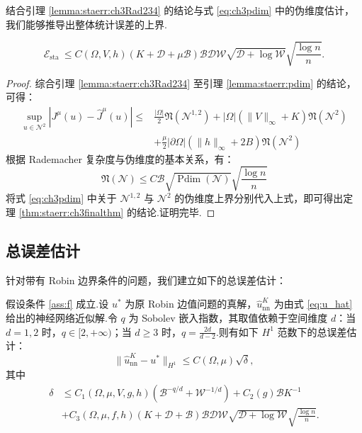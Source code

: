 结合引理 \ref{lemma:staerr:ch3Rad234} 的结论与式 \eqref{eq:ch3pdim} 中的伪维度估计，我们能够推导出整体统计误差的上界.
\begin{theorem}[统计误差]\label{thm:staerr:ch3finalthm}
\begin{equation*}
\mathcal{E}_{\text {sta }}\leq C(\Omega,V,h)\left(K+\mathcal{D} +\mu\mathcal{B}\right)\mathcal{B}\mathcal{D} \mathcal{W} \sqrt{\mathcal{D}+\log \mathcal{W}}\sqrt{\frac{\log n}{n}}.
\end{equation*}
\end{theorem}

\begin{proof}
综合引理 \ref{lemma:staerr:ch3Rad234} 至引理 \ref{lemma:staerr:pdim} 的结论，可得：
\begin{equation*}
\begin{aligned}
\sup _{u \in \mathcal{N}^{2}}\left|J^{\mu}(u)-\widehat{J}^{\mu}(u)\right|\leq &\frac{|\Omega|}{2}\mathfrak{N}\left(\mathcal{N}^{1,2}\right)+|\Omega|\left(\|V\|_{\infty}+K\right)\mathfrak{N}\left(\mathcal{N}^{2}\right)\\
&+\frac{\mu}{2}|\partial\Omega|\left(\|h\|_{\infty}+2B\right)\mathfrak{N}\left(\mathcal{N}^{2}\right)
\end{aligned}
\end{equation*}
根据 Rademacher 复杂度与伪维度的基本关系，有：
\begin{equation*}
\mathfrak{N}\left(\mathcal{N}\right)\leq C\mathcal{B}\sqrt{\operatorname{Pdim}(\mathcal{N})} \sqrt{\frac{\log{n}}{n}}
\end{equation*}
将式 \eqref{eq:ch3pdim} 中关于 $\mathcal{N}^{1,2}$ 与 $\mathcal{N}^{2}$ 的伪维度上界分别代入上式，即可得出定理 \ref{thm:staerr:ch3finalthm} 的结论.证明完毕.
\end{proof}


\subsection{总误差估计}\label{sec:mainres}
针对带有 Robin 边界条件的问题，我们建立如下的总误差估计：
\begin{theorem}\label{mainthm:robin}
假设条件 \ref{ass:f} 成立.设 $u^*$ 为原 Robin 边值问题的真解，$\widehat{u}_{\text{nn}}^{K}$ 为由式 \eqref{eq:u_hat} 给出的神经网络近似解.令 $q$ 为 Sobolev 嵌入指数，其取值依赖于空间维度 $d$：当 $d=1,2$ 时，$q \in [2, +\infty)$；当 $d\geq 3$ 时，$q = \frac{2d}{d-2}$.则有如下 $H^1$ 范数下的总误差估计：
\begin{equation*}
\|\widehat{u}_{\text{nn}}^K-u^*\|_{H^{1}}\leq C(\Omega,\mu)\sqrt{\delta},
\end{equation*}
其中
\begin{equation*}
\begin{aligned}
\delta&\leq\displaystyle C_1\left(\Omega, \mu, V, g, h\right) \left(\mathcal{B}^{-q / d}+\mathcal{W}^{-1 / d}\right)+C_2(g) \mathcal{B}K^{-1}\\
{}&\displaystyle+C_3(\Omega,\mu, f, h)(K+\mathcal{D}+\mathcal{B}) \mathcal{B} \mathcal{D} \mathcal{W} \sqrt{\mathcal{D}+\log \mathcal{W}} \sqrt{\frac{\log n}{n}}.
\end{aligned}
\end{equation*}
\end{theorem}

